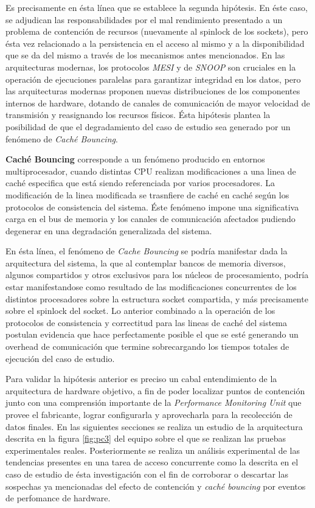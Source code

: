 Es precisamente en ésta línea que se establece la segunda hipótesis. En éste caso, se adjudican las responsabilidades por el mal rendimiento presentado a un problema de contención de recursos (nuevamente al spinlock de los sockets), pero ésta vez relacionado a la persistencia en el acceso al mismo y a la disponibilidad que se da del mismo a través de los mecanismos antes mencionados. En las arquitecturas modernas, los protocolos \emph{MESI} y de \emph{SNOOP} son cruciales en la operación de ejecuciones paralelas para garantizar integridad en los datos, pero las arquitecturas modernas proponen nuevas distribuciones de los componentes internos de hardware, dotando de canales de comunicación de mayor velocidad de transmisión y reasignando los recursos físicos. Ésta hipótesis plantea la posibilidad de que el degradamiento del caso de estudio sea generado por un fenómeno de \emph{Caché Bouncing}.

\begin{defn} \textbf{Caché Bouncing} corresponde a un fenómeno producido en entornos multiprocesador, cuando distintas CPU realizan modificaciones a una linea de caché especifica que está siendo referenciada por varios procesadores. La modificación de la linea modificada se trasnfiere de caché en caché según los protocolos de consistencia del sistema. Éste fenómeno impone una significativa carga en el bus de memoria y los canales de comunicación afectados pudiendo degenerar en una degradación generalizada del sistema.
\end{defn}

En ésta línea, el fenómeno de \emph{Cache Bouncing} se podría manifestar dada la arquitectura del sistema, la que al contemplar bancos de memoria diversos, algunos compartidos y otros exclusivos para los núcleos de procesamiento, podría estar manifestandose como resultado de las modificaciones concurrentes de los distintos procesadores sobre la estructura socket compartida, y más precisamente sobre el spinlock del socket. Lo anterior combinado a la operación de los protocolos de consistencia y correctitud para las lineas de caché del sistema postulan evidencia que hace perfectamente posible el que se esté generando un overhead de comunicación que termine sobrecargando los tiempos totales de ejecución del caso de estudio.

Para validar la hipótesis anterior es preciso un cabal entendimiento de la arquitectura de hardware objetivo, a fin de poder localizar puntos de contención junto con una comprensión importante de la \emph{Performance Monitoring Unit} que provee el fabricante, lograr configurarla y aprovecharla para la recolección de datos finales. En las siguientes secciones se realiza un estudio de la arquitectura descrita en la figura \ref{fig:pc3} del equipo sobre el que se realizan las pruebas experimentales reales. Posteriormente se realiza un análisis experimental de las tendencias presentes en una tarea de acceso concurrente como la descrita en el caso de estudio de ésta investigación con el fin de corroborar o descartar las sospechas ya mencionadas del efecto de contención y \emph{caché bouncing} por eventos de perfomance de hardware.

